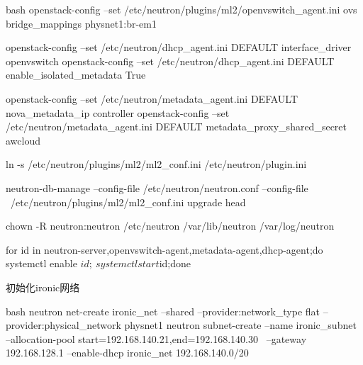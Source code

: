\begin{code-block}{bash}
openstack-config --set /etc/neutron/plugins/ml2/openvswitch_agent.ini ovs bridge_mappings physnet1:br-em1

openstack-config --set /etc/neutron/dhcp_agent.ini DEFAULT interface_driver openvswitch
openstack-config --set /etc/neutron/dhcp_agent.ini DEFAULT enable_isolated_metadata True

openstack-config --set /etc/neutron/metadata_agent.ini DEFAULT nova_metadata_ip controller
openstack-config --set /etc/neutron/metadata_agent.ini DEFAULT metadata_proxy_shared_secret awcloud

ln -s /etc/neutron/plugins/ml2/ml2_conf.ini /etc/neutron/plugin.ini

neutron-db-manage --config-file /etc/neutron/neutron.conf --config-file \
    /etc/neutron/plugins/ml2/ml2_conf.ini upgrade head

chown -R neutron:neutron /etc/neutron /var/lib/neutron /var/log/neutron

for id in neutron-{server,openvswitch-agent,metadata-agent,dhcp-agent};do systemctl enable $id; \
    systemctl start $id;done
\end{code-block}

初始化ironic网络
\begin{code-block}{bash}
neutron net-create ironic_net --shared --provider:network_type flat --provider:physical_network physnet1
neutron subnet-create --name ironic_subnet --allocation-pool start=192.168.140.21,end=192.168.140.30 \
    --gateway 192.168.128.1 --enable-dhcp ironic_net 192.168.140.0/20
\end{code-block}

